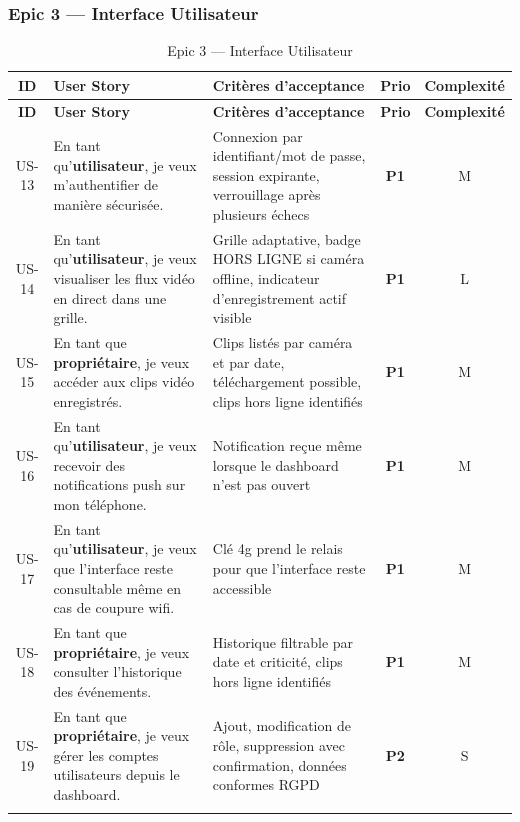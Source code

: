 \documentclass[12pt,a4paper]{article}
\begin{document}
\subsubsection{Epic 3 --- Interface Utilisateur}

\begin{longtable}{|c|p{3.8cm}|p{6.3cm}|c|c|}
\hline
\textbf{ID} & \textbf{User Story} & \textbf{Critères d'acceptance} & \textbf{Prio} & \textbf{Complexité} \\
\hline
\endfirsthead
\hline
\textbf{ID} & \textbf{User Story} & \textbf{Critères d'acceptance} & \textbf{Prio} & \textbf{Complexité} \\
\hline
\endhead
US-13 & En tant qu'\textbf{utilisateur}, je veux m'authentifier de manière sécurisée. & Connexion par identifiant/mot de passe, session expirante, verrouillage après plusieurs échecs & \textbf{P1} & M \\
\hline
US-14 & En tant qu'\textbf{utilisateur}, je veux visualiser les flux vidéo en direct dans une grille. & Grille adaptative, badge HORS LIGNE si caméra offline, indicateur d'enregistrement actif visible & \textbf{P1} & L \\
\hline
US-15 & En tant que \textbf{propriétaire}, je veux accéder aux clips vidéo enregistrés. & Clips listés par caméra et par date, téléchargement possible, clips hors ligne identifiés & \textbf{P1} & M \\
\hline
US-16 & En tant qu'\textbf{utilisateur}, je veux recevoir des notifications push sur mon téléphone. & Notification reçue même lorsque le dashboard n'est pas ouvert & \textbf{P1} & M \\
\hline
US-17 & En tant qu'\textbf{utilisateur}, je veux que l'interface reste consultable même en cas de coupure wifi. & Clé 4g prend le relais pour que l'interface reste accessible & \textbf{P1} & M \\
\hline
US-18 & En tant que \textbf{propriétaire}, je veux consulter l'historique des événements. & Historique filtrable par date et criticité, clips hors ligne identifiés & \textbf{P1} & M \\
\hline
US-19 & En tant que \textbf{propriétaire}, je veux gérer les comptes utilisateurs depuis le dashboard. & Ajout, modification de rôle, suppression avec confirmation, données conformes RGPD & \textbf{P2} & S \\
\hline
\caption{Epic 3 --- Interface Utilisateur}
\end{longtable}
\end{document}
